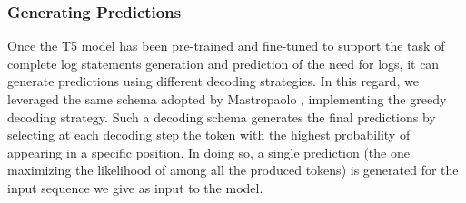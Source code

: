 \subsubsection{Generating Predictions}
Once the T5 model has been pre-trained and fine-tuned to support the task of complete log statements generation and prediction of the need for logs, it can generate predictions using different decoding strategies. In this regard, we leveraged the same schema adopted by Mastropaolo \etal \cite{mastropaolo2022using}, implementing the greedy decoding strategy. Such a decoding schema generates the final predictions by selecting at each decoding step the token with the highest probability of appearing in a specific position. In doing so, a single prediction (\ie the one maximizing the likelihood of among all the produced tokens) is generated for the input sequence we give as input to the model.




